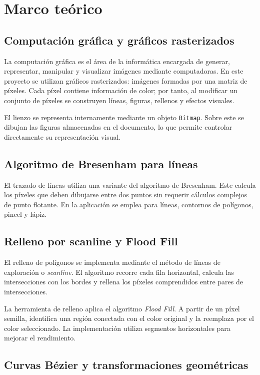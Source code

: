 \documentclass[11pt,a4paper]{report}
\begin{document}
\chapter{Marco teórico}

\section{Computación gráfica y gráficos rasterizados}

La computación gráfica es el área de la informática encargada de generar, representar, manipular y visualizar imágenes mediante computadoras. En este proyecto se utilizan gráficos rasterizados: imágenes formadas por una matriz de píxeles. Cada píxel contiene información de color; por tanto, al modificar un conjunto de píxeles se construyen líneas, figuras, rellenos y efectos visuales.

El lienzo se representa internamente mediante un objeto \texttt{Bitmap}. Sobre este se dibujan las figuras almacenadas en el documento, lo que permite controlar directamente su representación visual.

\section{Algoritmo de Bresenham para líneas}

El trazado de líneas utiliza una variante del algoritmo de Bresenham. Este calcula los píxeles que deben dibujarse entre dos puntos sin requerir cálculos complejos de punto flotante. En la aplicación se emplea para líneas, contornos de polígonos, pincel y lápiz.

\section{Relleno por scanline y Flood Fill}

El relleno de polígonos se implementa mediante el método de líneas de exploración o \textit{scanline}. El algoritmo recorre cada fila horizontal, calcula las intersecciones con los bordes y rellena los píxeles comprendidos entre pares de intersecciones.

La herramienta de relleno aplica el algoritmo \textit{Flood Fill}. A partir de un píxel semilla, identifica una región conectada con el color original y la reemplaza por el color seleccionado. La implementación utiliza segmentos horizontales para mejorar el rendimiento.

\section{Curvas Bézier y transformaciones geométricas}
\end{document}
